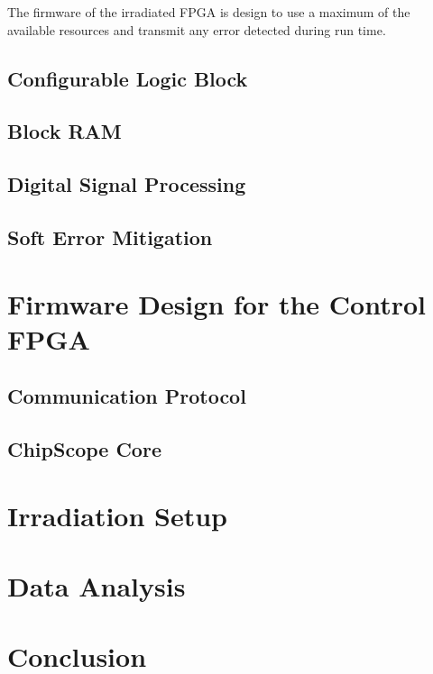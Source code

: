    The firmware of the irradiated FPGA is design to use a maximum of the available resources and transmit any error detected during run time.

    \subsection{Configurable Logic Block}

    \subsection{Block RAM}

    \subsection{Digital Signal Processing}

    \subsection{Soft Error Mitigation}

  \section{Firmware Design for the Control FPGA}

    \subsection{Communication Protocol}

    \subsection{ChipScope Core}

  \section{Irradiation Setup}

  \section{Data Analysis}

  \section{Conclusion}
